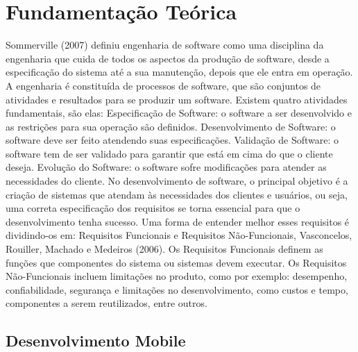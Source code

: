 \chapter{Fundamentação Teórica}
\label{cap:fundamentacao-teorica}

Sommerville (2007) definiu engenharia de software como uma disciplina da engenharia que cuida de todos os aspectos da produção de software, desde a especificação do sistema até a sua manutenção, depois que ele entra em operação. 
A engenharia é constituída de processos de software, que são conjuntos de atividades e resultados para se produzir um software. Existem quatro atividades fundamentais, são elas: 
Especificação de Software: o software a ser desenvolvido e as restrições para sua operação são definidos. 
Desenvolvimento de Software: o software deve ser feito atendendo suas especificações. 
Validação de Software: o software tem de ser validado para garantir que está em cima do que o cliente deseja. 
Evolução do Software: o software sofre modificações para atender as necessidades do cliente. 
No desenvolvimento de software, o principal objetivo é a criação de sistemas que atendam às necessidades dos clientes e usuários, ou seja, uma correta especificação dos requisitos se torna essencial para que o desenvolvimento tenha sucesso. Uma forma de entender melhor esses requisitos é dividindo-os em: Requisitos Funcionais e Requisitos Não-Funcionais, Vasconcelos, Rouiller, Machado e Medeiros (2006). 
Os Requisitos Funcionais definem as funções que componentes do sistema ou sistemas devem executar. 
Os Requisitos Não-Funcionais incluem limitações no produto, como por exemplo: desempenho, confiabilidade, segurança e limitações no desenvolvimento, como custos e tempo, componentes a serem reutilizados, entre outros.

\section{Desenvolvimento Mobile}
\label{sec:desenvolvimento-mobile}

\lipsum[10]

	\begin{figure}[h!]
		\centering
	\end{figure}
	
